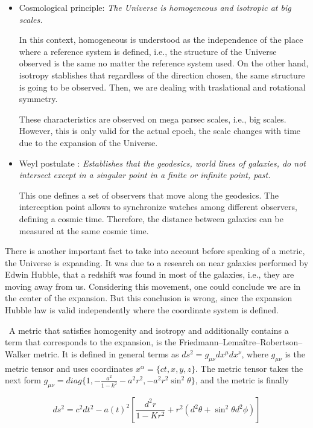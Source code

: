 \begin{itemize}
\item Cosmological principle: \emph{ The Universe is homogeneous and isotropic 
at big scales.}


In this context, homogeneous is understood as the independence of the place 
where a reference system is defined, i.e., the structure of the Universe observed 
is the same no matter the reference system used. 
On the other hand, isotropy stablishes that regardless of the direction chosen, 
the same structure is going to be observed. Then, we are dealing with traslational
and rotational symmetry. 

These characteristics are observed on mega parsec scales, i.e., big scales. 
However, this is only valid for the actual epoch, the scale changes with time due 
to the expansion of the Universe. 


\item Weyl postulate :\emph{ Establishes that the geodesics, world lines of 
galaxies, do not intersect except in a singular point in a finite or infinite 
point, past.} 

This one defines a set of observers that move along the geodesics. 
The interception point allows to synchronize watches among different observers,
defining a cosmic time. Therefore, the distance between galaxies can
be measured at the same cosmic time. 

\end{itemize} 

There is another important fact to take into account before speaking of a metric,
the Universe is expanding. It was due to a research on near galaxies performed
by Edwin Hubble, that a redshift was found in most of the galaxies, i.e., they
are moving away from us. 
Considering this movement, one could conclude we are in the center of the 
expansion. But this conclusion is wrong, since the expansion Hubble law is
valid independently where the coordinate system is defined. 

\
A metric that satisfies homogenity and isotropy and additionally
contains a term that corresponds to the expansion, is the 
Friedmann–Lemaître–Robertson–Walker metric. It is defined in 
general terms as $ds^2 = g_{\mu\nu}dx^{\mu}dx^{\nu}$, where $g_{\mu\nu}$
is the metric tensor and uses coordinates $x^{\alpha} = \{ct,x,y,z\}$.
The metric tensor takes the next form $ g_{\mu\nu} = diag\{1,-\frac{a^2}{1-k^2}
-a^2r^2,-a^2r^2\sin^2\theta\}$, and the metric is finally 

\begin{equation}
ds^2= c^2dt^2-a(t)^2\left[\frac{d^2r}{1-Kr^2} +r^2(d^2\theta
 + \sin^2\theta d^2\phi )\right]
\label{metric}
\end{equation} 	

